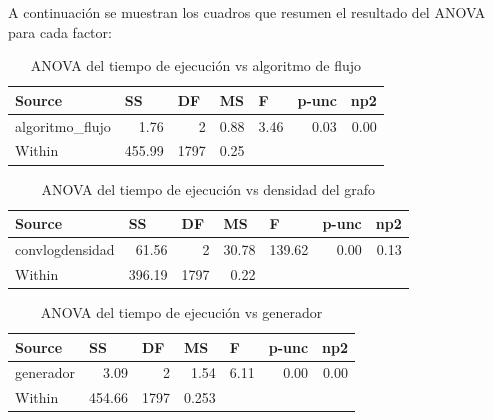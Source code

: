 \documentclass{article}
\begin{document}
A continuación se muestran los cuadros que resumen el resultado del ANOVA para cada factor:

\begin{table}[htbp]
  \centering
  \caption{ANOVA del tiempo de ejecución vs algoritmo de flujo}
    \begin{tabular}{lrrrlll}
    \toprule
    \textbf{Source} & \multicolumn{1}{l}{\textbf{SS}} & \multicolumn{1}{l}{\textbf{DF}} & \multicolumn{1}{l}{\textbf{MS}} & \textbf{F} & \textbf{p-unc} & \textbf{np2} \\
    \midrule
    algoritmo\_flujo & 1.76  & 2     & 0.88  & \multicolumn{1}{r}{3.46} & \multicolumn{1}{r}{0.03} & \multicolumn{1}{r}{0.00} \\
    Within & 455.99 & 1797  & 0.25 &      &   & \\
    \bottomrule
    \end{tabular}%
  \label{tab:addlabel}%
\end{table}%

\begin{table}[htbp]
  \centering
  \caption{ANOVA del tiempo de ejecución vs densidad del grafo}
    \begin{tabular}{lrrrlll}
    \toprule
    \textbf{Source} & \multicolumn{1}{l}{\textbf{SS}} & \multicolumn{1}{l}{\textbf{DF}} & \multicolumn{1}{l}{\textbf{MS}} & \textbf{F} & \textbf{p-unc} & \textbf{np2} \\
    \midrule
    convlogdensidad & 61.56 & 2     & 30.78 & \multicolumn{1}{r}{139.62} & \multicolumn{1}{r}{0.00} & \multicolumn{1}{r}{0.13} \\
    Within & 396.19 & 1797  & 0.22  &     &      &  \\
    \bottomrule
    \end{tabular}%
  \label{tab:addlabel}%
\end{table}%

\begin{table}[htbp]
  \centering
  \caption{ANOVA del tiempo de ejecución vs generador}
    \begin{tabular}{lrrrlll}
    \toprule
    \textbf{Source} & \multicolumn{1}{l}{\textbf{SS}} & \multicolumn{1}{l}{\textbf{DF}} & \multicolumn{1}{l}{\textbf{MS}} & \textbf{F} & \textbf{p-unc} & \textbf{np2} \\
    \midrule
    generador & 3.09& 2     & 1.54& \multicolumn{1}{r}{6.11} & \multicolumn{1}{r}{0.00} & \multicolumn{1}{r}{0.00} \\
    Within & 454.66 & 1797  & 0.253 &     &      &  \\
    \bottomrule
    \end{tabular}%
  \label{tab:addlabel}%
\end{table}%
\end{document}

